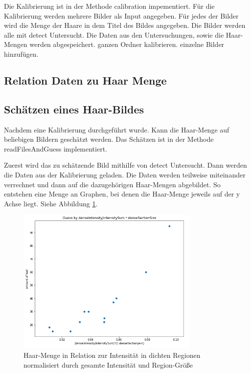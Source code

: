 \documentclass[german,a4paper, 12pt]{scrartcl}
\begin{document}
Die Kalibrierung ist in der Methode calibration impementiert.
Für die Kalibrierung werden mehrere Bilder als Input angegeben. Für jedes der Bilder wird die Menge der Haare in dem Titel des Bildes angegeben. 
Die Bilder werden alle mit detect Untersucht. Die Daten aus den Untersuchungen, sowie die Haar-Mengen werden abgespeichert.
ganzen Ordner kalibrieren. einzelne Bilder hinzufügen.

\subsection{Relation Daten zu Haar Menge}



\subsection{Schätzen eines Haar-Bildes}

Nachdem eine Kalibrierung durchgeführt wurde. Kann die Haar-Menge auf beliebigen Bildern geschätzt werden.
Das Schätzen ist in der Methode readFilesAndGuess implementiert.

Zuerst wird das zu schätzende Bild mithilfe von detect Untersucht.
Dann werden die Daten aus der Kalibrierung geladen. 
Die Daten werden teilweise miteinander verrechnet und dann auf die dazugehörigen Haar-Mengen abgebildet.
So entstehen eine Menge an Graphen, bei denen die Haar-Menge jeweils auf der y Achse liegt. Siehe Abbildung \ref{fig:mapping}. 

\begin{figure}
	\centering
	\includegraphics[width=0.8\textwidth]{fig64/gh4.PNG}
	\caption[]{Haar-Menge in Relation zur Intensität in dichten Regionen normalisiert durch gesamte Intensität und Region-Größe}
	\label{fig:mapping}
\end{figure}
\end{document}

